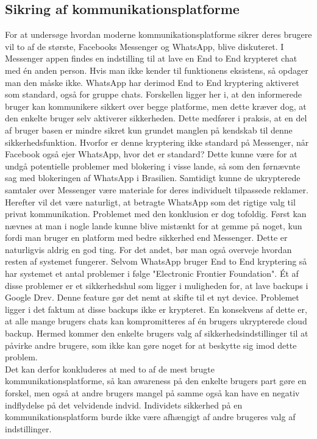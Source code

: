 \subsection{Sikring af kommunikationsplatforme}
For at undersøge hvordan moderne kommunikationsplatforme sikrer deres brugere vil to af de største, Facebooks Messenger og WhatsApp, blive diskuteret. I Messenger appen findes en indstilling til at lave en End to End krypteret chat med én anden person. Hvis man ikke kender til funktionens eksistens, så opdager man den måske ikke. WhatsApp har derimod End to End kryptering aktiveret som standard, også for gruppe chats. Forskellen ligger her i, at den informerede bruger kan kommunikere sikkert over begge platforme, men dette kræver dog, at den enkelte bruger selv aktiverer sikkerheden. Dette medfører i praksis, at en del af bruger basen er mindre sikret kun grundet manglen på kendskab til denne sikkerhedsfunktion. Hvorfor er denne kryptering ikke standard på Messenger, når Facebook også ejer WhatsApp\cite{Facebook_WhatsApp_Merger}, hvor det er standard? Dette kunne være for at undgå potentielle problemer med blokering i visse lande\cite{Facebook_security_features}, så som den førnævnte sag med blokeringen af WhatsApp i Brasilien. Samtidigt kunne de ukrypterede samtaler over Messenger være materiale for deres individuelt tilpassede reklamer.
\\
Herefter vil det være naturligt, at betragte WhatsApp som det rigtige valg til privat kommunikation. Problemet med den konklusion er dog tofoldig. Først kan nævnes at man i nogle lande kunne blive mistænkt for at gemme på noget, kun fordi man bruger en platform med bedre sikkerhed end Messenger. Dette er naturligvis aldrig en god ting. For det andet, bør man også overveje hvordan resten af systemet fungerer. Selvom WhatsApp bruger End to End kryptering så har systemet et antal problemer i følge "Electronic Frontier Foundation"\cite{WhatsApp_Security_Concerns}. Ét af disse problemer er et sikkerhedshul som ligger i muligheden for, at lave backups i Google Drev. Denne feature gør det nemt at skifte til et nyt device. Problemet ligger i det faktum at disse backups ikke er krypteret. En konsekvens af dette er, at alle mange brugers chats kan kompromitteres af én brugers ukrypterede cloud backup. Hermed kommer den enkelte brugers valg af sikkerhedsindstillinger til at påvirke andre brugere, som ikke kan gøre noget for at beskytte sig imod dette problem.
\\
Det kan derfor konkluderes at med to af de mest brugte kommunikationsplatforme, så kan awareness på den enkelte brugers part gøre en forskel, men også at andre brugers mangel på samme også kan have en negativ indflydelse på det velvidende indvid. Individets sikkerhed på en kommunikationsplatform burde ikke være afhængigt af andre brugeres valg af indstillinger.